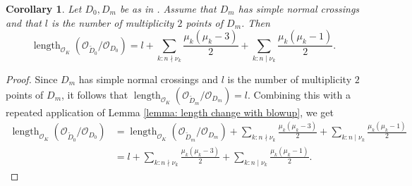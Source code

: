 \documentclass[12pt]{amsart}
\numberwithin{equation}{section}
\newtheorem{corollary}[equation]{Corollary}
\theoremstyle{definition}
\renewcommand{\O}{\mathcal{O}}
\DeclareMathOperator{\len}{length}
\renewcommand{\l}[2]{\len_{\O_K}(\mathcal{O}_{#1}/\mathcal{O}_{#2})}
\begin{document}
\begin{corollary}\label{Elengthexpression}
 Let $D_0,D_m$ be as in . Assume that $D_m$ has simple normal crossings and that $l$ is the number of multiplicity $2$ points of $D_m$. Then
 \[ \l{\tilde{D}_0}{D_0}=l+\sum_{k:n\nmid\nu_k}\frac{\mu_k(\mu_k-3)}{2}+\sum_{k:n\mid\nu_k}\frac{\mu_k(\mu_k-1)}{2}.\]
\end{corollary}
\begin{proof}
Since $D_m$ has simple normal crossings and $l$ is the number of multiplicity $2$ points of $D_m$, it follows that $\l{\tilde{D}_m}{D_m} = l$. Combining this with a repeated application of Lemma \ref{lemma: length change with blowup}, we get
\begin{equation*}
    \begin{aligned}
        \l{\tilde{D}_0}{D_0}&=\l{\tilde{D}_m}{D_m}+\sum_{k:n\nmid\nu_k}\frac{\mu_k(\mu_k-3)}{2}+\sum_{k:n\mid\nu_k}\frac{\mu_k(\mu_k-1)}{2}\\
        &=l+\sum_{k:n\nmid\nu_k}\frac{\mu_k(\mu_k-3)}{2}+\sum_{k:n\mid\nu_k}\frac{\mu_k(\mu_k-1)}{2}.
      \end{aligned} 
      \end{equation*}
\end{proof}
\end{document}
